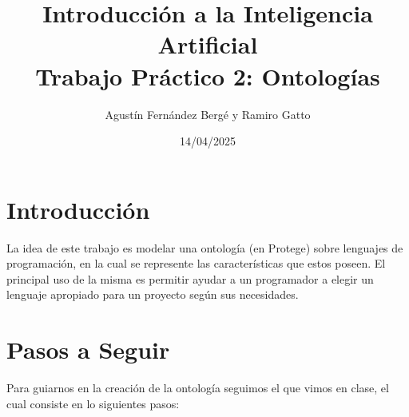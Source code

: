 \documentclass[12pt, titlepage, a4paper]{article}
\title{Introducción a la Inteligencia Artificial \\
Trabajo Práctico 2: Ontologías }
\author{Agustín Fernández Bergé y Ramiro Gatto}
\date{14/04/2025}
\begin{document}
\maketitle
    

\section{Introducción}
La idea de este trabajo es modelar una ontología 
(en Protege) sobre lenguajes de  
programación, en la cual se represente las características que estos 
poseen. El principal uso de la misma es permitir ayudar a un programador
a elegir un lenguaje apropiado para un proyecto según sus necesidades. 

\section{Pasos a Seguir}
Para guiarnos en la creación de la ontología seguimos el  que 
vimos en clase, el cual consiste en lo siguientes pasos:
\end{document}
